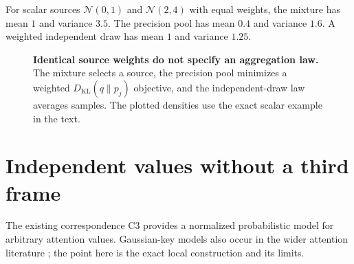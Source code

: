 \documentclass[11pt,letterpaper]{article}
\newcommand{\KL}{D_{\mathrm{KL}}}
\theoremstyle{remark}
\begin{document}
For scalar sources $\mathcal N(0,1)$ and $\mathcal N(2,4)$ with equal weights, the mixture has mean $1$ and variance $3.5$. The precision pool has mean $0.4$ and variance $1.6$. A weighted independent draw has mean $1$ and variance $1.25$.

\begin{figure}[tb]
\centering
{}
\caption{\textbf{Identical source weights do not specify an aggregation law.} The mixture selects a source, the precision pool minimizes a weighted $\KL(q\|p_j)$ objective, and the independent-draw law averages samples. The plotted densities use the exact scalar example in the text.}
\label{fig:pool}
\end{figure}

\section{Independent values without a third frame}
\label{sec:source-content}
The existing correspondence C3 provides a normalized probabilistic model for arbitrary attention values. Gaussian-key models also occur in the wider attention literature \cite{Nguyen2022}; the point here is the exact local construction and its limits.
\end{document}
